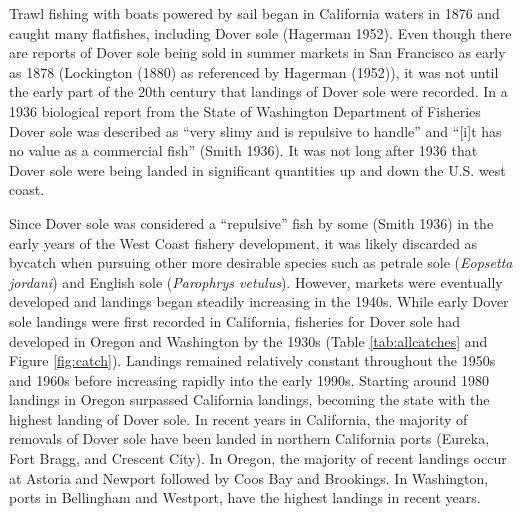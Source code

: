 \documentclass[11pt,
  english,
  a4paper,
]{article}
\begin{document}
\leavevmode\tagmcend\tagstructend


Trawl fishing with boats powered by sail began in California waters in 1876 and caught many flatfishes, including Dover sole {(Hagerman 1952)\leavevmode\tagmcend\tagstructend}. Even though there are reports of Dover sole being sold in summer markets in San Francisco as early as 1878 (Lockington {(1880)\leavevmode\tagmcend\tagstructend} as referenced by Hagerman {(1952)\leavevmode\tagmcend\tagstructend}), it was not until the early part of the 20th century that landings of Dover sole were recorded. In a 1936 biological report from the State of Washington Department of Fisheries Dover sole was described as ``very slimy and is repulsive to handle'' and ``{[}i{]}t has no value as a commercial fish'' {(Smith 1936)\leavevmode\tagmcend\tagstructend}. It was not long after 1936 that Dover sole were being landed in significant quantities up and down the U.S. west coast.

\leavevmode\tagmcend\tagstructend\par


Since Dover sole was considered a ``repulsive'' fish by some {(Smith 1936)\leavevmode\tagmcend\tagstructend} in the early years of the West Coast fishery development, it was likely discarded as bycatch when pursuing other more desirable species such as petrale sole (\emph{Eopsetta jordani}) and English sole (\emph{Parophrys vetulus}). However, markets were eventually developed and landings began steadily increasing in the 1940s. While early Dover sole landings were first recorded in California, fisheries for Dover sole had developed in Oregon and Washington by the 1930s (Table \ref{tab:allcatches} and Figure \ref{fig:catch}). Landings remained relatively constant throughout the 1950s and 1960s before increasing rapidly into the early 1990s. Starting around 1980 landings in Oregon surpassed California landings, becoming the state with the highest landing of Dover sole. In recent years in California, the majority of removals of Dover sole have been landed in northern California ports (Eureka, Fort Bragg, and Crescent City). In Oregon, the majority of recent landings occur at Astoria and Newport followed by Coos Bay and Brookings. In Washington, ports in Bellingham and Westport, have the highest landings in recent years.
\end{document}
